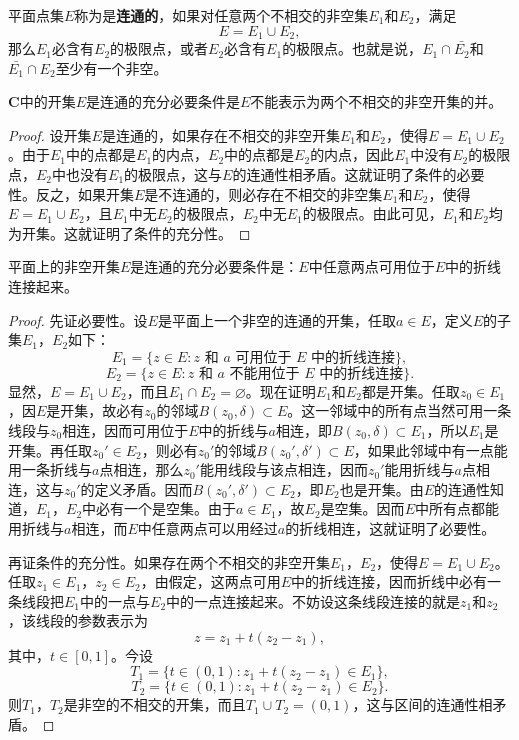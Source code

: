 \documentclass[../../main.tex]{subfiles}
\begin{document}
\begin{definition}
平面点集\(E\)称为是\textbf{连通的}，如果对任意两个不相交的非空集\(E_1\)和\(E_2\)，满足
\[
E = E_1 \cup E_2,
\]
那么\(E_1\)必含有\(E_2\)的极限点，或者\(E_2\)必含有\(E_1\)的极限点。也就是说，\(E_1 \cap \bar{E_2}\)和\(\bar{E_1} \cap E_2\)至少有一个非空。
\end{definition}

\begin{proposition}\label{proposition:集合连通的条件}
\(\mathbf{C}\)中的开集\(E\)是连通的充分必要条件是\(E\)不能表示为两个不相交的非空开集的并。
\end{proposition}
\begin{proof}
设开集\(E\)是连通的，如果存在不相交的非空开集\(E_1\)和\(E_2\)，使得\(E = E_1 \cup E_2\)。由于\(E_1\)中的点都是\(E_1\)的内点，\(E_2\)中的点都是\(E_2\)的内点，因此\(E_1\)中没有\(E_2\)的极限点，\(E_2\)中也没有\(E_1\)的极限点，这与\(E\)的连通性相矛盾。这就证明了条件的必要性。反之，如果开集\(E\)是不连通的，则必存在不相交的非空集\(E_1\)和\(E_2\)，使得\(E = E_1 \cup E_2\)，且\(E_1\)中无\(E_2\)的极限点，\(E_2\)中无\(E_1\)的极限点。由此可见，\(E_1\)和\(E_2\)均为开集。这就证明了条件的充分性。 
\end{proof}

\begin{theorem}\label{theorem:连通集合的性质}
平面上的非空开集\(E\)是连通的充分必要条件是：\(E\)中任意两点可用位于\(E\)中的折线连接起来。
\end{theorem}
\begin{proof}
先证必要性。设\(E\)是平面上一个非空的连通的开集，任取\(a \in E\)，定义\(E\)的子集\(E_1\)，\(E_2\)如下：
\[
E_1 = \{ z \in E : z \text{ 和 } a \text{ 可用位于 } E \text{ 中的折线连接} \},
\]
\[
E_2 = \{ z \in E : z \text{ 和 } a \text{ 不能用位于 } E \text{ 中的折线连接} \}.
\]
显然，\(E = E_1 \cup E_2\)，而且\(E_1 \cap E_2 = \varnothing\)。现在证明\(E_1\)和\(E_2\)都是开集。任取\(z_0 \in E_1\)，因\(E\)是开集，故必有\(z_0\)的邻域\(B(z_0, \delta) \subset E\)。这一邻域中的所有点当然可用一条线段与\(z_0\)相连，因而可用位于\(E\)中的折线与\(a\)相连，即\(B(z_0, \delta) \subset E_1\)，所以\(E_1\)是开集。再任取\(z_0' \in E_2\)，则必有\(z_0'\)的邻域\(B(z_0', \delta') \subset E\)，如果此邻域中有一点能用一条折线与\(a\)点相连，那么\(z_0'\)能用线段与该点相连，因而\(z_0'\)能用折线与\(a\)点相连，这与\(z_0'\)的定义矛盾。因而\(B(z_0', \delta') \subset E_2\)，即\(E_2\)也是开集。由\(E\)的连通性知道，\(E_1\)，\(E_2\)中必有一个是空集。由于\(a \in E_1\)，故\(E_2\)是空集。因而\(E\)中所有点都能用折线与\(a\)相连，而\(E\)中任意两点可以用经过\(a\)的折线相连，这就证明了必要性。

再证条件的充分性。如果存在两个不相交的非空开集\(E_1\)，\(E_2\)，使得\(E = E_1 \cup E_2\)。任取\(z_1 \in E_1\)，\(z_2 \in E_2\)，由假定，这两点可用\(E\)中的折线连接，因而折线中必有一条线段把\(E_1\)中的一点与\(E_2\)中的一点连接起来。不妨设这条线段连接的就是\(z_1\)和\(z_2\)，该线段的参数表示为
\[
z = z_1 + t(z_2 - z_1),
\]
其中，\(t \in [0, 1]\)。今设
\[
T_1 = \{ t \in (0, 1) : z_1 + t(z_2 - z_1) \in E_1 \},
\]
\[
T_2 = \{ t \in (0, 1) : z_1 + t(z_2 - z_1) \in E_2 \}.
\]
则\(T_1\)，\(T_2\)是非空的不相交的开集，而且\(T_1 \cup T_2 = (0, 1)\)，这与区间的连通性相矛盾。 
\end{proof}
\end{document}
